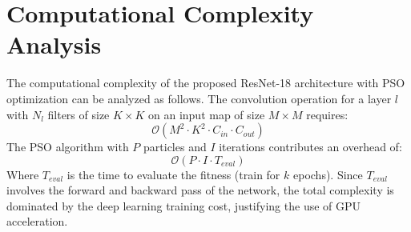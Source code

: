\documentclass[journal]{IEEEtran}
\begin{document}
\section{Computational Complexity Analysis}
The computational complexity of the proposed ResNet-18 architecture with PSO optimization can be analyzed as follows.
The convolution operation for a layer $l$ with $N_l$ filters of size $K \times K$ on an input map of size $M \times M$ requires:
\begin{equation}
\mathcal{O}(M^2 \cdot K^2 \cdot C_{in} \cdot C_{out})
\end{equation}
The PSO algorithm with $P$ particles and $I$ iterations contributes an overhead of:
\begin{equation}
\mathcal{O}(P \cdot I \cdot T_{eval})
\end{equation}
Where $T_{eval}$ is the time to evaluate the fitness (train for $k$ epochs). Since $T_{eval}$ involves the forward and backward pass of the network, the total complexity is dominated by the deep learning training cost, justifying the use of GPU acceleration.
\end{document}
